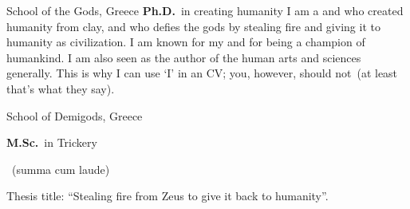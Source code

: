 	{%
		School of the Gods, Greece}
	{%
		\textbf{Ph.D.}~in creating humanity}
	{%
	I am a  and  who created humanity from clay, and who defies the gods by stealing fire and giving it to humanity as civilization. I am known for my  and for being a champion of humankind. I am also seen as the author of the human arts and sciences generally. This is why I can use `I' in an CV; you, however, should not~(at least that's what they say).}

		{%
			School of Demigods, Greece}
		{%
			\textbf{M.Sc.}~in Trickery\begin{footnotesize}
				~(summa cum laude)
			\end{footnotesize}}
		{%
		Thesis title: ``Stealing fire from Zeus to give it back to humanity''.}